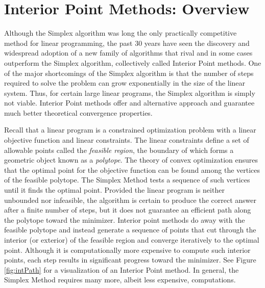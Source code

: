 
\section*{Interior Point Methods: Overview}
Although the Simplex algorithm was long the only practically competitive method for linear programming, the past 30 years have seen the
discovery and widespread adoption of a new family of algorithms that rival and in some cases outperform the Simplex algorithm, collectively
called Interior Point methods. One of the major shortcomings of the Simplex algorithm is that the number of steps required to solve the
problem can grow exponentially in the size of the linear system. Thus, for certain large linear programs, the Simplex algorithm is simply
not viable. Interior Point methods offer and alternative approach and guarantee much better theoretical convergence properties.

Recall that a linear program is a constrained optimization problem with a linear objective function and linear constraints.
The linear constraints define a set of allowable points called the \emph{feasible region}, the boundary of which forms a geometric
object known as a \emph{polytope}. The theory of convex optimization ensures that the optimal point for the objective function
can be found among the vertices of the feasible polytope. The Simplex Method tests a sequence of such vertices until it finds
the optimal point. Provided the linear program is neither unbounded nor infeasible, the algorithm is certain to produce the correct
answer after a finite number of steps, but it does not guarantee an efficient path along the polytope toward the minimizer. Interior
point methods do away with the feasible polytope and instead generate a sequence of points that cut through the interior (or
exterior) of the feasible region and converge iteratively to the optimal point. Although it is computationally more expensive to
compute such interior points, each step results in significant progress toward the minimizer. See Figure \ref{fig:intPath} for
a visualization of an Interior Point method. In general, the Simplex Method requires many more, albeit less expensive, computations.


